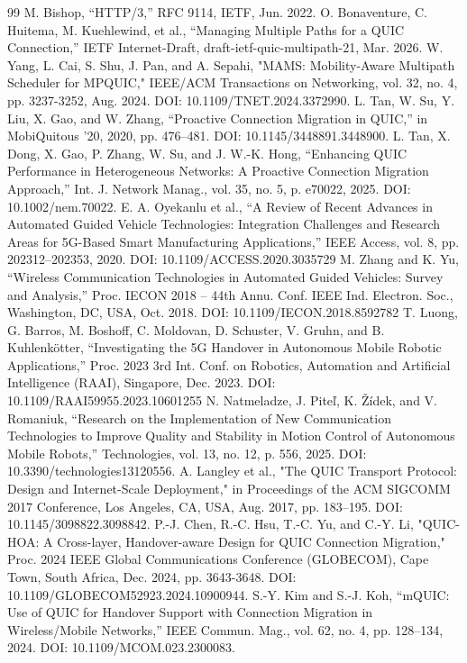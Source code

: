 \documentclass[preprint,11pt]{elsarticle}
\begin{document}
\begin{thebibliography}{99}
 M. Bishop, ``HTTP/3,'' RFC 9114, IETF, Jun. 2022.
 O. Bonaventure, C. Huitema, M. Kuehlewind, et al., ``Managing Multiple Paths for a QUIC Connection,'' IETF Internet-Draft, draft-ietf-quic-multipath-21, Mar. 2026.
 W. Yang, L. Cai, S. Shu, J. Pan, and A. Sepahi, "MAMS: Mobility-Aware Multipath Scheduler for MPQUIC," IEEE/ACM Transactions on Networking, vol. 32, no. 4, pp. 3237-3252, Aug. 2024. DOI: 10.1109/TNET.2024.3372990.
 L. Tan, W. Su, Y. Liu, X. Gao, and W. Zhang, ``Proactive Connection Migration in QUIC,'' in MobiQuitous '20, 2020, pp. 476--481. DOI: 10.1145/3448891.3448900.
 L. Tan, X. Dong, X. Gao, P. Zhang, W. Su, and J. W.-K. Hong, ``Enhancing QUIC Performance in Heterogeneous Networks: A Proactive Connection Migration Approach,'' Int. J. Network Manag., vol. 35, no. 5, p. e70022, 2025. DOI: 10.1002/nem.70022.
 E. A. Oyekanlu et al., ``A Review of Recent Advances in Automated Guided Vehicle Technologies: Integration Challenges and Research Areas for 5G-Based Smart Manufacturing Applications,'' IEEE Access, vol. 8, pp. 202312--202353, 2020. DOI: 10.1109/ACCESS.2020.3035729
 M. Zhang and K. Yu, ``Wireless Communication Technologies in Automated Guided Vehicles: Survey and Analysis,'' Proc. IECON 2018 -- 44th Annu. Conf. IEEE Ind. Electron. Soc., Washington, DC, USA, Oct. 2018. DOI: 10.1109/IECON.2018.8592782
 T. Luong, G. Barros, M. Boshoff, C. Moldovan, D. Schuster, V. Gruhn, and B. Kuhlenkötter, ``Investigating the 5G Handover in Autonomous Mobile Robotic Applications,'' Proc. 2023 3rd Int. Conf. on Robotics, Automation and Artificial Intelligence (RAAI), Singapore, Dec. 2023. DOI: 10.1109/RAAI59955.2023.10601255
 N. Natmeladze, J. Piteľ, K. Žídek, and V. Romaniuk, ``Research on the Implementation of New Communication Technologies to Improve Quality and Stability in Motion Control of Autonomous Mobile Robots,'' Technologies, vol. 13, no. 12, p. 556, 2025. DOI: 10.3390/technologies13120556.
 A. Langley et al., "The QUIC Transport Protocol: Design and Internet-Scale Deployment," in Proceedings of the ACM SIGCOMM 2017 Conference, Los Angeles, CA, USA, Aug. 2017, pp. 183--195. DOI: 10.1145/3098822.3098842.
 P.-J. Chen, R.-C. Hsu, T.-C. Yu, and C.-Y. Li, "QUIC-HOA: A Cross-layer, Handover-aware Design for QUIC Connection Migration," Proc. 2024 IEEE Global Communications Conference (GLOBECOM), Cape Town, South Africa, Dec. 2024, pp. 3643-3648. DOI: 10.1109/GLOBECOM52923.2024.10900944.
 S.-Y. Kim and S.-J. Koh, ``mQUIC: Use of QUIC for Handover Support with Connection Migration in Wireless/Mobile Networks,'' IEEE Commun. Mag., vol. 62, no. 4, pp. 128--134, 2024. DOI: 10.1109/MCOM.023.2300083.

\end{thebibliography}
\end{document}
